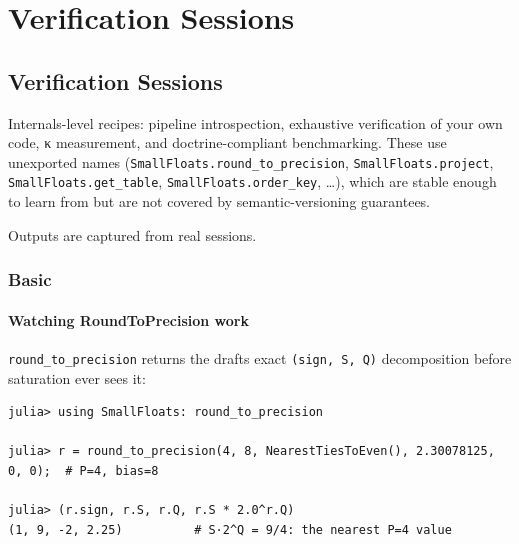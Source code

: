 \chapter{Verification Sessions}


\section{Verification Sessions}



\label{1434860327305972106}{}


Internals-level recipes: pipeline introspection, exhaustive verification of your own code, κ measurement, and doctrine-compliant benchmarking. These use unexported names (\texttt{SmallFloats.round\_\allowbreak{}to\_\allowbreak{}precision}, \texttt{SmallFloats.project}, \texttt{SmallFloats.get\_\allowbreak{}table}, \texttt{SmallFloats.order\_\allowbreak{}key}, …), which are stable enough to learn from but are not covered by semantic-versioning guarantees.



Outputs are captured from real sessions.



\subsection{Basic}



\label{13551325986707881962-dup2}{}


\subsubsection{Watching RoundToPrecision work}



\label{2755073532632396567}{}


\texttt{round\_\allowbreak{}to\_\allowbreak{}precision} returns the draft{\textquotesingle}s exact \texttt{(sign, S, Q)} decomposition before saturation ever sees it:




\nopagebreak[4]
\begin{verbatim}
julia> using SmallFloats: round_to_precision

julia> r = round_to_precision(4, 8, NearestTiesToEven(), 2.30078125, 0, 0);  # P=4, bias=8

julia> (r.sign, r.S, r.Q, r.S * 2.0^r.Q)
(1, 9, -2, 2.25)          # S·2^Q = 9/4: the nearest P=4 value
\end{verbatim}



